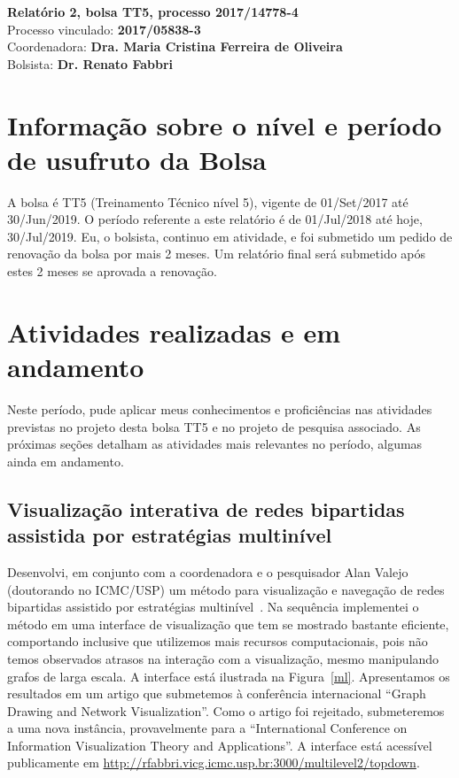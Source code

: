 \documentclass[a4paper, 11pt]{article}
\begin{document}
\noindent
\normalsize
 \textbf{Relatório 2, bolsa TT5, processo 2017/14778-4}\\
Processo vinculado: \textbf{2017/05838-3} \\
Coordenadora: \textbf{Dra. Maria Cristina Ferreira de Oliveira} \\
Bolsista: \textbf{Dr. Renato Fabbri} \\

\section{Informação sobre o nível e período de usufruto da Bolsa}
A bolsa é TT5 (Treinamento Técnico nível 5), vigente de 01/Set/2017 até 30/Jun/2019.
O período referente a este relatório é de 01/Jul/2018 até hoje, 30/Jul/2019.
Eu, o bolsista, continuo em atividade, e foi submetido um pedido de renovação da bolsa por mais 2 meses.
Um relatório final será submetido após estes 2 meses se aprovada a renovação.

\section{Atividades realizadas e em andamento}\label{desc}
Neste período, pude aplicar meus conhecimentos e proficiências nas atividades previstas no projeto desta bolsa TT5 e no projeto de pesquisa associado.
As próximas seções detalham as atividades mais relevantes no período, algumas ainda em andamento.

\subsection{Visualização interativa de redes bipartidas assistida por estratégias multinível}\label{sml}
Desenvolvi, em conjunto com a coordenadora e o pesquisador Alan Valejo (doutorando no ICMC/USP)
um método para visualização e navegação de redes bipartidas assistido por estratégias multinível~\cite{alan}.
    Na sequência implementei o método em uma interface de visualização que tem se mostrado bastante eficiente, comportando inclusive que utilizemos mais recursos computacionais, pois não temos observados atrasos na interação com a visualização, mesmo manipulando grafos de larga escala.
    A interface está ilustrada na Figura~\ref{ml}.
    Apresentamos os resultados em um artigo que submetemos à conferência internacional ``Graph Drawing and Network Visualization''.
    Como o artigo foi rejeitado, submeteremos a uma nova instância, provavelmente para a ``International Conference on Information Visualization Theory and Applications''.
    A interface está acessível  publicamente em \url{http://rfabbri.vicg.icmc.usp.br:3000/multilevel2/topdown}.
\end{document}
